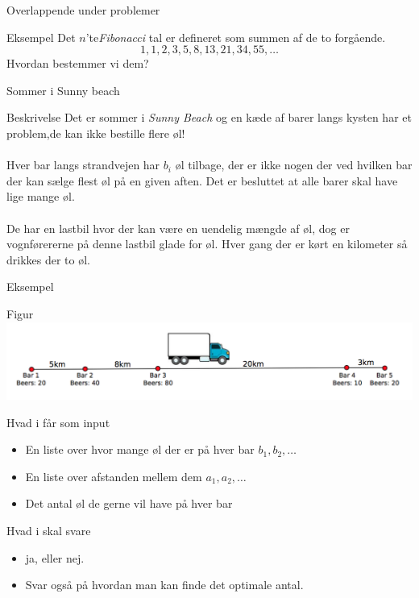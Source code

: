 \documentclass[12pt,t]{beamer}
\begin{document}
\begin{frame}[c]{Overlappende under problemer}
  \begin{block}{Eksempel}
    Det $n$'te\emph{Fibonacci} tal er defineret som summen af de to
    forgående.
    $$
      1,1,2,3,5,8,13,21,34,55, \dots
    $$
    \pause
    Hvordan bestemmer vi dem?
  \end{block}
\end{frame}

\begin{frame}[c]{Sommer i Sunny beach}
  \begin{block}{Beskrivelse}
    Det er sommer i \emph{Sunny Beach} og en kæde af barer langs kysten
    har et problem,\pause  de kan ikke bestille flere øl!
    \\
    \pause  ~ \\
    Hver bar langs strandvejen har $b_i$ øl tilbage, der er ikke
    nogen der ved hvilken bar der kan sælge flest øl på en given aften.
    \pause
    Det er besluttet at alle barer skal have lige mange øl. \\
    \pause
    ~\\
    De har en lastbil hvor der kan være en uendelig mængde af øl, \pause
    dog er vognførererne på denne lastbil glade for øl. Hver gang der er
    kørt en kilometer så drikkes der to øl.
  \end{block}
\end{frame}

\begin{frame}[c]{Eksempel}
  \begin{block}{Figur}
    \includegraphics[scale=0.5]{include/fragt.png}
  \end{block}
  \pause
  \begin{block}{Hvad i får som input}
    \begin{itemize}
      \item En liste over hvor mange øl der er på hver bar $b_1, b_2, \dots$
      \item En liste over afstanden mellem dem $a_1, a_2, \dots$ \pause
      \item Det antal øl de gerne vil have på hver bar \pause
    \end{itemize}
  \end{block}

  \begin{block}{Hvad i skal svare}
    \begin{itemize}
      \item ja, eller nej. \pause
      \item Svar også på hvordan man kan finde det optimale antal.
    \end{itemize}
  \end{block}
\end{frame}
\end{document}
